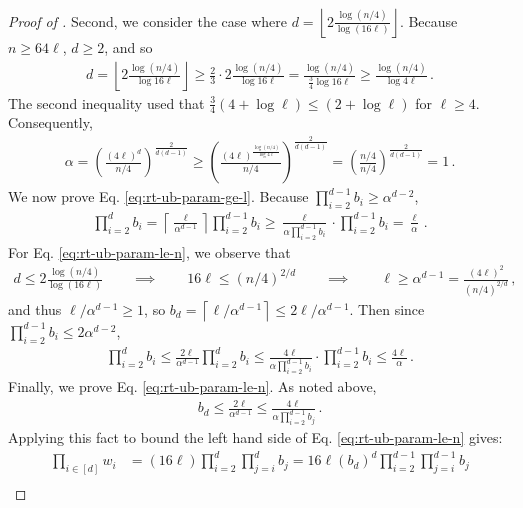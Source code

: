 \documentclass[10pt,a4paper]{article}
\theoremstyle{definition}
\theoremstyle{remark}
\newcommand{\ceil}[1]{{\left\lceil{#1}\right\rceil}}
\newcommand{\floor}[1]{{\left\lfloor{#1}\right\rfloor}}
\newcommand{\rl}{\mathbf{\ell}}             %
\begin{document}
\begin{itemize}
\begin{itemize}
\begin{proof}[Proof of ]
  Second, we consider the case where $d = \floor{2 \frac{\log (n/4)}{\log(16\rl)}}$. Because $n \ge 64 \rl$, $d \ge 2$, and so
  \begin{align*}
    d = \floor{2 \frac{\log (n/4)}{\log 16 \rl}} \ge \frac{2}{3} \cdot 2 \frac{\log (n/4)}{\log 16 \rl} = \frac{\log (n/4)}{\frac{3}{4} \log 16 \rl} \ge \frac{\log (n / 4)}{\log 4 \rl} \,.
  \end{align*}
  The second inequality used that $\frac{3}{4} (4 + \log \rl) \le (2 + \log \rl)$ for $\rl \ge 4$. Consequently,
  \begin{align*}
    \alpha = \left(\frac{(4 \rl)^{d}}{n/4}\right)^{\frac{2}{d(d-1)}} \ge \left(\frac{(4 \rl)^{\frac{\log (n / 4)}{\log 4 \rl}}}{n/4}\right)^{\frac{2}{d(d-1)}} =  \left(\frac{n/4}{n/4}\right)^{\frac{2}{d(d-1)}} = 1 \,.
  \end{align*}
  We now prove Eq. \ref{eq:rt-ub-param-ge-l}. Because $\prod_{i=2}^{d-1} b_i \ge \alpha^{d - 2}$,
  \begin{align*}
    \prod_{i=2}^{d} b_i = \ceil{\frac{\rl}{\alpha^{d - 1}}} \prod_{i=2}^{d-1} b_i \ge \frac{\rl}{\alpha \prod_{i=2}^{d-1} b_i} \cdot \prod_{i=2}^{d-1} b_i = \frac{\rl}{\alpha} \,.
  \end{align*}
  For Eq. \ref{eq:rt-ub-param-le-n}, we observe that
  \begin{align*}
    d \le 2 \frac{\log(n/4)}{\log(16 \rl)}  \qquad \implies \qquad 16\rl \le (n/4)^{2/d} \qquad \implies \qquad \rl \ge \alpha^{d - 1} =\frac{(4 \rl)^2}{(n/4)^{2/d}} \,,
  \end{align*}
  and thus $\rl / \alpha^{d - 1} \ge 1$, so $b_d = \ceil{\rl / \alpha^{d -1}} \le 2 \rl / \alpha^{d - 1}$. Then since  $\prod_{i=2}^{d-1} b_i \le 2 \alpha^{d - 2}$,
  \begin{align*}
    \prod_{i=2}^{d} b_i \le \frac{2 \rl}{\alpha^{d - 1}} \prod_{i=2}^{d} b_i \le \frac{4 \rl}{\alpha \prod_{i=2}^{d-1} b_i} \cdot \prod_{i=2}^{d-1} b_i \le \frac{4 \rl}{\alpha} \,.
  \end{align*}
  Finally, we prove Eq. \ref{eq:rt-ub-param-le-n}. As noted above,
  \begin{align*}
    b_d \le \frac{2 \rl}{\alpha^{d-1}} \le \frac{4 \rl}{\alpha \prod_{i=2}^{d-1} b_j} \,.
  \end{align*}
  Applying this fact to bound the left hand side of Eq. \ref{eq:rt-ub-param-le-n} gives:
  \begin{align*}
    \prod_{i \in [d]} w_i &= (16 \rl) \prod_{i = 2}^d \prod_{j=i}^d b_j = 16 \rl (b_d)^d \prod_{i = 2}^{d-1} \prod_{j=i}^{d-1} b_j \\

\end{align*}
\end{proof}
\end{itemize}
\end{itemize}
\end{document}
